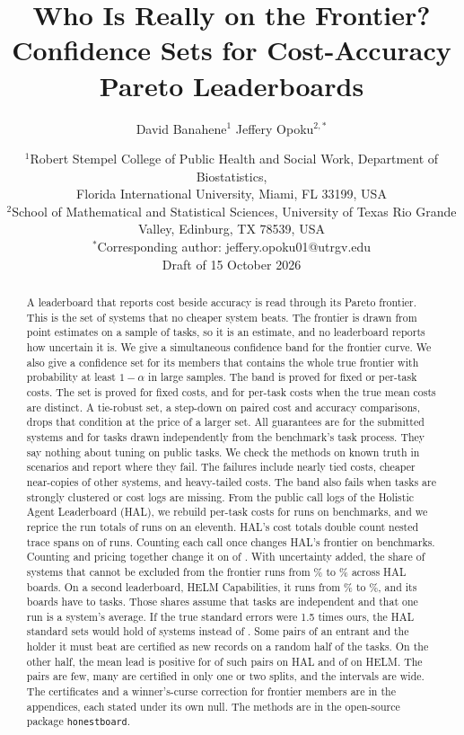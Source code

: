 \documentclass[11pt]{article}
\title{Who Is Really on the Frontier?\\Confidence Sets for Cost-Accuracy Pareto Leaderboards}
\author{David Banahene$^{1}$ \quad Jeffery Opoku$^{2,*}$}
\date{\small
$^1$Robert Stempel College of Public Health and Social Work, Department of Biostatistics,\\
Florida International University, Miami, FL 33199, USA\\
$^2$School of Mathematical and Statistical Sciences, University of Texas Rio Grande Valley, Edinburg, TX 78539, USA\\[3pt]
$^*$Corresponding author: jeffery.opoku01@utrgv.edu\\[8pt]
Draft of 15 October 2026}
\begin{document}
\maketitle

\begin{abstract}
A leaderboard that reports cost beside accuracy is read through its Pareto frontier. This is the set of systems that no cheaper system beats. The frontier is drawn from point estimates on a sample of tasks, so it is an estimate, and no leaderboard reports how uncertain it is. We give a simultaneous confidence band for the frontier curve. We also give a confidence set for its members that contains the whole true frontier with probability at least $1-\alpha$ in large samples. The band is proved for fixed or per-task costs. The set is proved for fixed costs, and for per-task costs when the true mean costs are distinct. A tie-robust set, a step-down on paired cost and accuracy comparisons, drops that condition at the price of a larger set. All guarantees are for the submitted systems and for tasks drawn independently from the benchmark's task process. They say nothing about tuning on public tasks. We check the methods on known truth in \NumValScenarios{} scenarios and report where they fail. The failures include nearly tied costs, cheaper near-copies of other systems, and heavy-tailed costs. The band also fails when tasks are strongly clustered or cost logs are missing. From the public call logs of the Holistic Agent Leaderboard (HAL), we rebuild per-task costs for \NumHalSystemsPerTaskCost{} runs on \NumHalBoardsPerTask{} benchmarks, and we reprice the run totals of \NumHalSystemsFixedCost{} runs on an eleventh. HAL's cost totals double count nested trace spans on \NumDupRunsAffected{} of \NumDupRunsTotal{} runs. Counting each call once changes HAL's frontier on \NumFlipBoardsChangedCounting{} benchmarks. Counting and pricing together change it on \NumFlipBoardsChanged{} of \NumFlipBoards{}. With uncertainty added, the share of systems that cannot be excluded from the frontier runs from \NumHalSetShareMinPct\% to \NumHalSetShareMaxPct\% across HAL boards. On a second leaderboard, HELM Capabilities, it runs from \NumHelmSetShareMinPct\% to \NumHelmSetShareMaxPct\%, and its boards have \NumHelmTasksMin{} to \NumHelmTasksMax{} tasks. Those shares assume that tasks are independent and that one run is a system's average. If the true standard errors were 1.5 times ours, the HAL standard sets would hold \NumInflHalSetOneFive{} of \NumInflHalSystems{} systems instead of \NumInflHalSetOne{}. Some pairs of an entrant and the holder it must beat are certified as new records on a random half of the tasks. On the other half, the mean lead is positive for \NumReplHalCertPairsLeadPos{} of \NumReplHalCertPairs{} such pairs on HAL and \NumReplHelmCertPairsLeadPos{} of \NumReplHelmCertPairs{} on HELM. The pairs are few, many are certified in only one or two splits, and the intervals are wide. The certificates and a winner's-curse correction for frontier members are in the appendices, each stated under its own null. The methods are in the open-source package \texttt{honestboard}.
\end{abstract}
\end{document}
